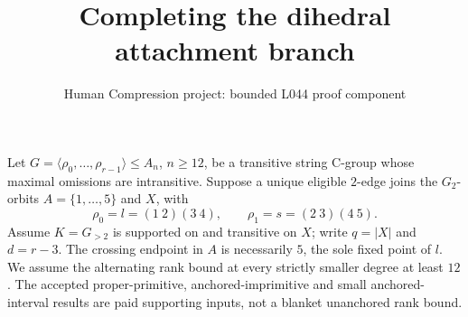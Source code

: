 \documentclass[11pt,a4paper]{article}
\title{Completing the dihedral attachment branch}
\author{Human Compression project: bounded L044 proof component}
\date{}
\newcommand{\gen}[1]{\langle#1\rangle}
\begin{document}
\maketitle
Let $G=\gen{\rho_0,\ldots,\rho_{r-1}}\leq A_n$, $n\geq12$,
be a transitive string C-group whose maximal omissions are
intransitive. Suppose a unique eligible $2$-edge joins the
$G_2$-orbits $A=\{1,\ldots,5\}$ and $X$, with
\[
 \rho_0=l=(1\ 2)(3\ 4),\qquad
 \rho_1=s=(2\ 3)(4\ 5).
\]
Assume $K=G_{>2}$ is supported on and transitive on $X$;
write $q=|X|$ and $d=r-3$. The crossing endpoint in $A$ is
necessarily $5$, the sole fixed point of $l$.
We assume the alternating rank bound at every strictly smaller
degree at least $12$. The accepted proper-primitive,
anchored-imprimitive and small anchored-interval results are
paid supporting inputs, not a blanket unanchored rank bound.
\end{document}
